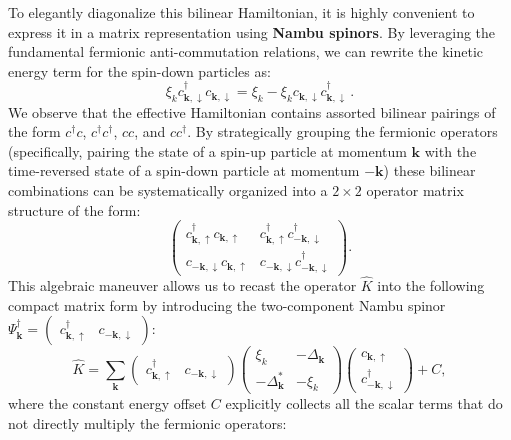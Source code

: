 To elegantly diagonalize this bilinear Hamiltonian, it is highly convenient to express it in a matrix representation using \textbf{Nambu spinors}. By leveraging the fundamental fermionic anti-commutation relations, we can rewrite the kinetic energy term for the spin-down particles as:
\[
    \xi_k c_{\mathbf{k},\downarrow}^\dagger c_{\mathbf{k},\downarrow} = \xi_k - \xi_k c_{\mathbf{k},\downarrow} c_{\mathbf{k},\downarrow}^\dagger \, .
\]
We observe that the effective Hamiltonian contains assorted bilinear pairings of the form \( c^\dagger c \), \( c^\dagger c^\dagger \), \( c c \), and \( c c^\dagger \). By strategically grouping the fermionic operators (specifically, pairing the state of a spin-up particle at momentum \( \mathbf{k} \) with the time-reversed state of a spin-down particle at momentum \( -\mathbf{k} \)) these bilinear combinations can be systematically organized into a \( 2 \times 2 \) operator matrix structure of the form:
\[
    \begin{pmatrix}
        c_{\mathbf{k},\uparrow}^\dagger c_{\mathbf{k},\uparrow} & c_{\mathbf{k},\uparrow}^\dagger c_{-\mathbf{k},\downarrow}^\dagger \\
        c_{-\mathbf{k},\downarrow} c_{\mathbf{k},\uparrow}      & c_{-\mathbf{k},\downarrow} c_{-\mathbf{k},\downarrow}^\dagger
    \end{pmatrix}.
\]
This algebraic maneuver allows us to recast the operator \( \hat{K} \) into the following compact matrix form by introducing the two-component Nambu spinor \( \Psi_{\mathbf{k}}^\dagger = \begin{pmatrix} c_{\mathbf{k},\uparrow}^\dagger & c_{-\mathbf{k},\downarrow} \end{pmatrix} \):
\begin{equation} \label{eq:nambu_hamiltonian}
    \hat{K} = \sum_{\mathbf{k}} \begin{pmatrix} c_{\mathbf{k},\uparrow}^\dagger & c_{-\mathbf{k},\downarrow} \end{pmatrix} \begin{pmatrix} \xi_k & -\Delta_{\mathbf{k}} \\ -\Delta_{\mathbf{k}}^* & -\xi_k \end{pmatrix} \begin{pmatrix} c_{\mathbf{k},\uparrow} \\ c_{-\mathbf{k},\downarrow}^\dagger \end{pmatrix} + C,
\end{equation}
where the constant energy offset \( C \) explicitly collects all the scalar terms that do not directly multiply the fermionic operators:
